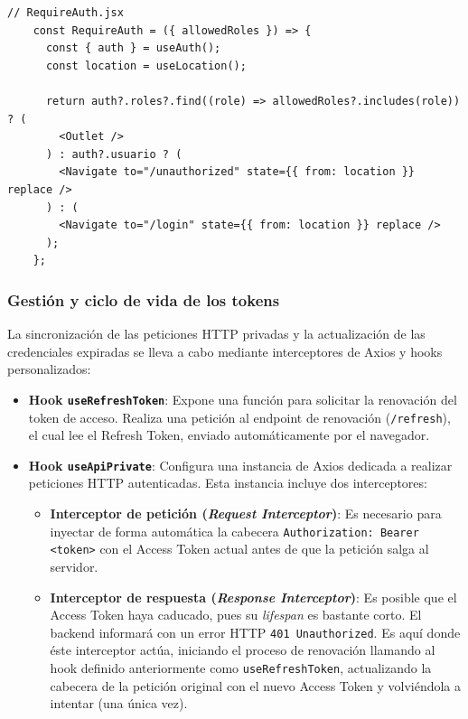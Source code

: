 \documentclass[11pt]{article}
\begin{document}
      \begin{lstlisting}[style=ReactStyle]
    // RequireAuth.jsx
    const RequireAuth = ({ allowedRoles }) => {
      const { auth } = useAuth();
      const location = useLocation();

      return auth?.roles?.find((role) => allowedRoles?.includes(role)) ? (
        <Outlet />
      ) : auth?.usuario ? (
        <Navigate to="/unauthorized" state={{ from: location }} replace />
      ) : (
        <Navigate to="/login" state={{ from: location }} replace />
      );
    };
\end{lstlisting}

      \subsubsection{Gestión y ciclo de vida de los tokens}

          La sincronización de las peticiones HTTP privadas y la actualización de las
          credenciales expiradas se lleva a cabo mediante interceptores de Axios y hooks
          personalizados:

          \begin{itemize}
              \item \textbf{Hook \texttt{useRefreshToken}}: Expone una función para solicitar la renovación del token de acceso. Realiza una petición al endpoint de renovación (\texttt{/refresh}), el cual lee el Refresh Token, enviado automáticamente por el navegador.
              \item \textbf{Hook \texttt{useApiPrivate}}: Configura una instancia de Axios dedicada a realizar peticiones HTTP autenticadas. Esta instancia incluye dos interceptores:
                    \begin{itemize}
                        \item \textbf{Interceptor de petición (\textit{Request Interceptor})}: Es necesario para inyectar de forma automática la cabecera \texttt{Authorization: Bearer <token>} con el Access Token actual antes de que la petición salga al servidor.
                        \item \textbf{Interceptor de respuesta (\textit{Response Interceptor})}: Es posible que el Access Token haya caducado, pues su \textit{lifespan} es bastante corto. El backend informará con un error HTTP \texttt{401 Unauthorized}. Es aquí donde éste interceptor actúa, iniciando el proceso de renovación llamando al hook definido anteriormente como \texttt{useRefreshToken}, actualizando la cabecera de la petición original con el nuevo Access Token y volviéndola a intentar (una única vez).
                    \end{itemize}
          \end{itemize}
\end{document}
